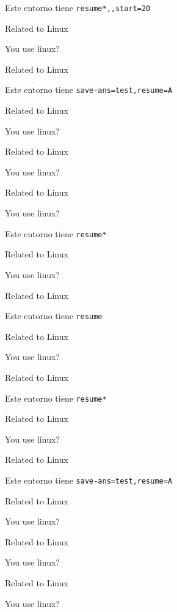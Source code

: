 \documentclass{article}
\begin{document}
Este entorno tiene \verb+resume*,,start=20+
\begin{enumext}[resume*,start=20]
  \item Related to Linux
  \item You use linux? %
  \item Related to Linux
\end{enumext}

Este entorno tiene \verb+save-ans=test,resume=A+

\begin{enumext}[save-ans=test,resume=A]
  \item Related to Linux
  \item You use linux? %
  \item Related to Linux
  \item You use linux? %
  \item Related to Linux
  \item You use linux? %
\end{enumext}

Este entorno tiene \verb+resume*+

\begin{enumext}[resume*]
  \item Related to Linux
  \item You use linux? %
  \item Related to Linux
\end{enumext}


Este entorno tiene \verb+resume+

\begin{enumext}[resume]
  \item Related to Linux
  \item You use linux? %
  \item Related to Linux
\end{enumext}

Este entorno tiene \verb+resume*+

\begin{enumext}[resume*]
  \item Related to Linux
  \item You use linux? %
  \item Related to Linux
\end{enumext}

Este entorno tiene \verb+save-ans=test,resume=A+

\begin{enumext}[save-ans=test,resume=A]
  \item Related to Linux
  \item You use linux? %
  \item Related to Linux
  \item You use linux? %
  \item Related to Linux
  \item You use linux? %
\end{enumext}
\end{document}
